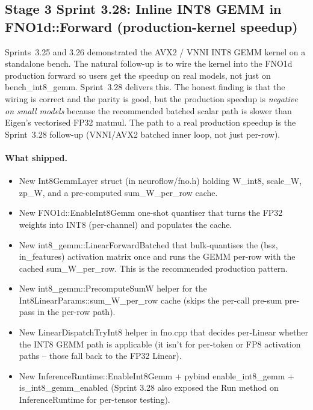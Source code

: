 \documentclass[10pt,twocolumn]{article}
\renewcommand{\texttt}[1]{{\normalfont\ttfamily #1}\normalfont\rmfamily}
\begin{document}
\subsection{Stage 3 Sprint 3.28: Inline INT8 GEMM in FNO1d::Forward (production-kernel speedup)}
\label{sec:inline-int8-gemm}

Sprints~3.25 and 3.26 demonstrated the
AVX2 / VNNI INT8 GEMM kernel on a
standalone bench.  The natural follow-up
is to wire the kernel into the FNO1d
production forward so users get the
speedup on real models, not just on
\texttt{bench\_int8\_gemm}.  Sprint~3.28
delivers this.  The honest finding is
that the wiring is correct and the
parity is good, but the production
speedup is \emph{negative on small
models} because the recommended batched
scalar path is slower than Eigen's
vectorised FP32 matmul.  The path to a
real production speedup is the
Sprint~3.28 follow-up (VNNI/AVX2
batched inner loop, not just per-row).

\paragraph{What shipped.}
\begin{itemize}
\item New \texttt{Int8GemmLayer} struct
  (in \texttt{neuroflow/fno.h}) holding
  \texttt{W\_int8}, \texttt{scale\_W},
  \texttt{zp\_W}, and a pre-computed
  \texttt{sum\_W\_per\_row} cache.
\item New \texttt{FNO1d::EnableInt8Gemm}
  one-shot quantiser that turns the
  FP32 weights into INT8 (per-channel)
  and populates the cache.
\item New \texttt{int8\_gemm::LinearForwardBatched}
  that bulk-quantises the
  \texttt{(bsz, in\_features)} activation
  matrix once and runs the GEMM
  per-row with the cached
  \texttt{sum\_W\_per\_row}.  This is
  the recommended production pattern.
\item New
  \texttt{int8\_gemm::PrecomputeSumW}
  helper for the
  \texttt{Int8LinearParams::sum\_W\_per\_row}
  cache (skips the per-call pre-sum
  pre-pass in the per-row path).
\item New \texttt{LinearDispatchTryInt8}
  helper in \texttt{fno.cpp} that
  decides per-Linear whether the INT8
  GEMM path is applicable (it isn't for
  per-token or FP8 activation paths --
  those fall back to the FP32 Linear).
\item New \texttt{InferenceRuntime::EnableInt8Gemm}
  + pybind \texttt{enable\_int8\_gemm} +
  \texttt{is\_int8\_gemm\_enabled}
  (Sprint 3.28 also exposed the
  \texttt{Run} method on
  \texttt{InferenceRuntime} for
  per-tensor testing).
\end{itemize}
\end{document}
